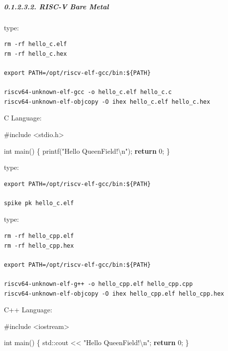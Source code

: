 \documentclass[
]{article}
\newenvironment{Shaded}{}{}
\newcommand{\BuiltInTok}[1]{#1}
\newcommand{\ControlFlowTok}[1]{\textcolor[rgb]{0.00,0.44,0.13}{\textbf{#1}}}
\newcommand{\DataTypeTok}[1]{\textcolor[rgb]{0.56,0.13,0.00}{#1}}
\newcommand{\DecValTok}[1]{\textcolor[rgb]{0.25,0.63,0.44}{#1}}
\newcommand{\ImportTok}[1]{#1}
\newcommand{\NormalTok}[1]{#1}
\newcommand{\PreprocessorTok}[1]{\textcolor[rgb]{0.74,0.48,0.00}{#1}}
\newcommand{\SpecialCharTok}[1]{\textcolor[rgb]{0.25,0.44,0.63}{#1}}
\newcommand{\StringTok}[1]{\textcolor[rgb]{0.25,0.44,0.63}{#1}}
\begin{document}
\hypertarget{risc-v-bare-metal-1}{%
\subparagraph{0.1.2.3.2. RISC-V Bare Metal}\label{risc-v-bare-metal-1}}

type:

\begin{verbatim}
rm -rf hello_c.elf
rm -rf hello_c.hex

export PATH=/opt/riscv-elf-gcc/bin:${PATH}

riscv64-unknown-elf-gcc -o hello_c.elf hello_c.c
riscv64-unknown-elf-objcopy -O ihex hello_c.elf hello_c.hex
\end{verbatim}

C Language:

\begin{Shaded}
\begin{Highlighting}[]
\PreprocessorTok{\#include }\ImportTok{\textless{}stdio.h\textgreater{}}

\DataTypeTok{int}\NormalTok{ main() \{}
\NormalTok{  printf(}\StringTok{"Hello QueenField!}\SpecialCharTok{\textbackslash{}n}\StringTok{"}\NormalTok{);}
  \ControlFlowTok{return} \DecValTok{0}\NormalTok{;}
\NormalTok{\}}
\end{Highlighting}
\end{Shaded}

type:

\begin{verbatim}
export PATH=/opt/riscv-elf-gcc/bin:${PATH}

spike pk hello_c.elf
\end{verbatim}

type:

\begin{verbatim}
rm -rf hello_cpp.elf
rm -rf hello_cpp.hex

export PATH=/opt/riscv-elf-gcc/bin:${PATH}

riscv64-unknown-elf-g++ -o hello_cpp.elf hello_cpp.cpp
riscv64-unknown-elf-objcopy -O ihex hello_cpp.elf hello_cpp.hex
\end{verbatim}

C++ Language:

\begin{Shaded}
\begin{Highlighting}[]
\PreprocessorTok{\#include }\ImportTok{\textless{}iostream\textgreater{}}

\DataTypeTok{int}\NormalTok{ main() \{}
  \BuiltInTok{std::}\NormalTok{cout \textless{}\textless{} }\StringTok{"Hello QueenField!}\SpecialCharTok{\textbackslash{}n}\StringTok{"}\NormalTok{;}
  \ControlFlowTok{return} \DecValTok{0}\NormalTok{;}
\NormalTok{\}}
\end{Highlighting}
\end{Shaded}
\end{document}

